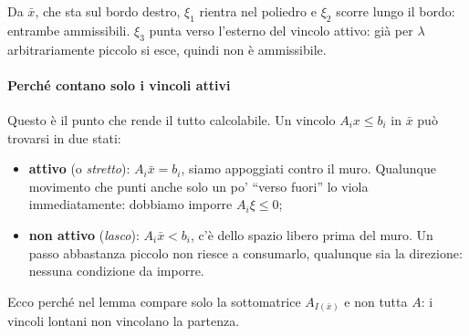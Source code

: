 \documentclass[12pt]{extarticle} %
\begin{document}
\begin{center}
\end{center}
\noindent Da $\bar{x}$, che sta sul bordo destro, $\xi_1$ rientra nel poliedro e $\xi_2$ scorre lungo il bordo: entrambe ammissibili. $\xi_3$ punta verso l'esterno del vincolo attivo: già per $\lambda$ arbitrariamente piccolo si esce, quindi non è ammissibile.

\paragraph{Perché contano solo i vincoli attivi}
Questo è il punto che rende il tutto calcolabile. Un vincolo $A_i x \le b_i$ in $\bar{x}$ può trovarsi in due stati:
\begin{itemize}
    \item \textbf{attivo} (o \emph{stretto}): $A_i\bar{x} = b_i$, siamo appoggiati contro il muro. Qualunque movimento che punti anche solo un po' ``verso fuori'' lo viola immediatamente: dobbiamo imporre $A_i\xi \le 0$;
    \item \textbf{non attivo} (\emph{lasco}): $A_i\bar{x} < b_i$, c'è dello spazio libero prima del muro. Un passo abbastanza piccolo non riesce a consumarlo, qualunque sia la direzione: nessuna condizione da imporre.
\end{itemize}
Ecco perché nel lemma compare solo la sottomatrice $A_{I(\bar{x})}$ e non tutta $A$: i vincoli lontani non vincolano la partenza.
\end{document}

